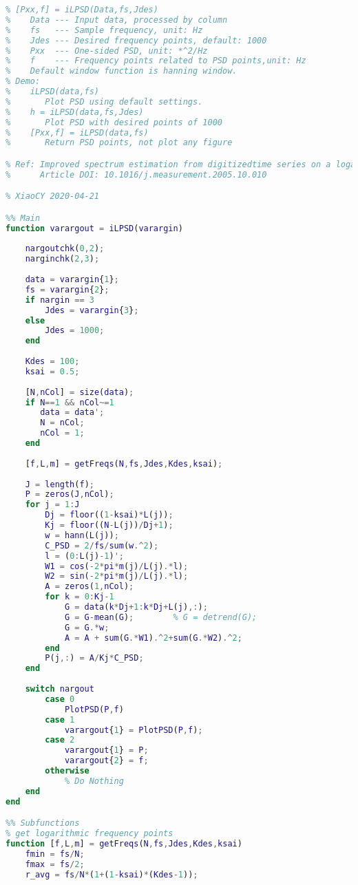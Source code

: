\begin{lstlisting}[language=Matlab]
% Use LPSD mothod to plot power spectral density
% [Pxx,f] = iLPSD(Data,fs,Jdes)
%    Data --- Input data, processed by column
%    fs   --- Sample frequency, unit: Hz
%    Jdes --- Desired frequency points, default: 1000
%    Pxx  --- One-sided PSD, unit: *^2/Hz
%    f    --- Frequency points related to PSD points,unit: Hz
%    Default window function is hanning window.
% Demo:
%    iLPSD(data,fs)
%       Plot PSD using default settings.
%    h = iLPSD(data,fs,Jdes)
%       Plot PSD with desired points of 1000
%    [Pxx,f] = iLPSD(data,fs)
%       Return PSD points, not plot any figure

% Ref: Improved spectrum estimation from digitizedtime series on a logarithmic frequency axis
%      Article DOI: 10.1016/j.measurement.2005.10.010

% XiaoCY 2020-04-21

%% Main
function varargout = iLPSD(varargin)
    
    nargoutchk(0,2);
    narginchk(2,3);
    
    data = varargin{1};
    fs = varargin{2};
    if nargin == 3
        Jdes = varargin{3};
    else
        Jdes = 1000;
    end
    
    Kdes = 100;
    ksai = 0.5;
    
    [N,nCol] = size(data);
    if N==1 && nCol~=1
       data = data';
       N = nCol;
       nCol = 1;
    end
    
    [f,L,m] = getFreqs(N,fs,Jdes,Kdes,ksai);
    
    J = length(f);
    P = zeros(J,nCol);
    for j = 1:J
        Dj = floor((1-ksai)*L(j));
        Kj = floor((N-L(j))/Dj+1);
        w = hann(L(j));
        C_PSD = 2/fs/sum(w.^2);
        l = (0:L(j)-1)';
        W1 = cos(-2*pi*m(j)/L(j).*l);
        W2 = sin(-2*pi*m(j)/L(j).*l);
        A = zeros(1,nCol);
        for k = 0:Kj-1
            G = data(k*Dj+1:k*Dj+L(j),:);
            G = G-mean(G);        % G = detrend(G);   
            G = G.*w;
            A = A + sum(G.*W1).^2+sum(G.*W2).^2;
        end
        P(j,:) = A/Kj*C_PSD;
    end
    
    switch nargout
        case 0
            PlotPSD(P,f)
        case 1
            varargout{1} = PlotPSD(P,f);
        case 2
            varargout{1} = P;
            varargout{2} = f;
        otherwise
            % Do Nothing
    end
end

%% Subfunctions
% get logarithmic frequency points
function [f,L,m] = getFreqs(N,fs,Jdes,Kdes,ksai)
    fmin = fs/N;
    fmax = fs/2;
    r_avg = fs/N*(1+(1-ksai)*(Kdes-1));
    

\end{lstlisting}
